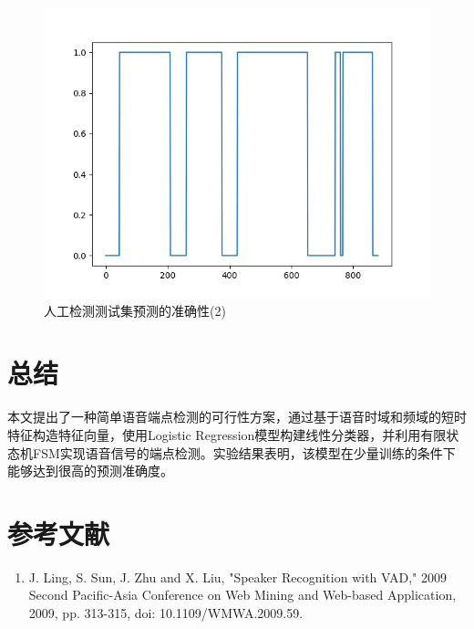 \documentclass[a4paper]{article}
\begin{document}
\begin{figure}[htb]
  \centering
  \includegraphics[scale=0.5]{figs/predict.png}
  \caption{人工检测测试集预测的准确性(2)}
  \label{fig:7}
\end{figure} 

\section{总结}

本文提出了一种简单语音端点检测的可行性方案，通过基于语音时域和频域的短时特征构造特征向量，使用Logistic Regression模型构建线性分类器，并利用有限状态机FSM实现语音信号的端点检测。实验结果表明，该模型在少量训练的条件下能够达到很高的预测准确度。

\section{参考文献}

\begin{enumerate}
    \item \label{ref1} J. Ling, S. Sun, J. Zhu and X. Liu, "Speaker Recognition with VAD," 2009 Second Pacific-Asia Conference on Web Mining and Web-based Application, 2009, pp. 313-315, doi: 10.1109/WMWA.2009.59.
\end{enumerate}
\end{document}
